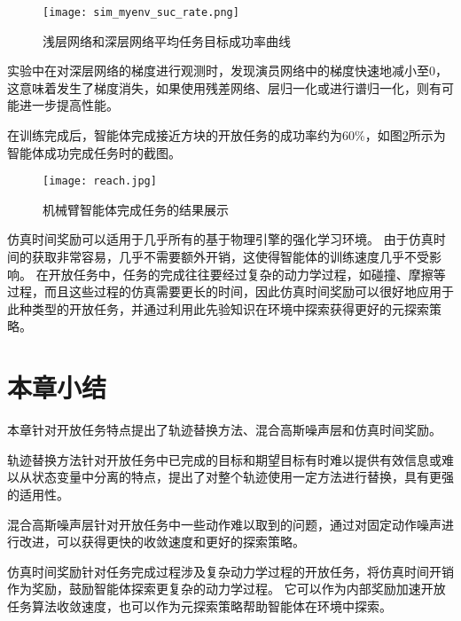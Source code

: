         \begin{figure}[htpb]
        \centering
        \texttt{[image: sim\_myenv\_suc\_rate.png]}
        \caption{浅层网络和深层网络平均任务目标成功率曲线}
            \label{simsuc_rate}
        \end{figure}
实验中在对深层网络的梯度进行观测时，发现演员网络中的梯度快速地减小至0，这意味着发生了梯度消失，如果使用残差网络、层归一化或进行谱归一化，则有可能进一步提高性能。

在训练完成后，智能体完成接近方块的开放任务的成功率约为60\%，如图\ref{reach}所示为智能体成功完成任务时的截图。

        \begin{figure}[htpb]
        \centering
        \texttt{[image: reach.jpg]}
        \caption{机械臂智能体完成任务的结果展示}
            \label{reach}
        \end{figure}
仿真时间奖励可以适用于几乎所有的基于物理引擎的强化学习环境。
由于仿真时间的获取非常容易，几乎不需要额外开销，这使得智能体的训练速度几乎不受影响。
在开放任务中，任务的完成往往要经过复杂的动力学过程，如碰撞、摩擦等过程，而且这些过程的仿真需要更长的时间，因此仿真时间奖励可以很好地应用于此种类型的开放任务，并通过利用此先验知识在环境中探索获得更好的元探索策略。
\section{本章小结}
本章针对开放任务特点提出了轨迹替换方法、混合高斯噪声层和仿真时间奖励。

轨迹替换方法针对开放任务中已完成的目标和期望目标有时难以提供有效信息或难以从状态变量中分离的特点，提出了对整个轨迹使用一定方法进行替换，具有更强的适用性。

混合高斯噪声层针对开放任务中一些动作难以取到的问题，通过对固定动作噪声进行改进，可以获得更快的收敛速度和更好的探索策略。

仿真时间奖励针对任务完成过程涉及复杂动力学过程的开放任务，将仿真时间开销作为奖励，鼓励智能体探索更复杂的动力学过程。
它可以作为内部奖励加速开放任务算法收敛速度，也可以作为元探索策略帮助智能体在环境中探索。
